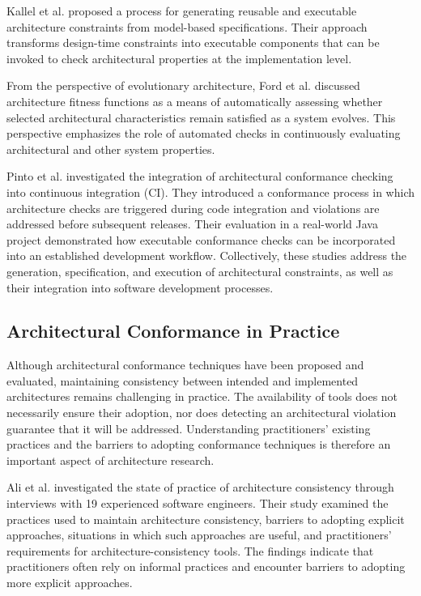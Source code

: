 Kallel et al. \cite{kallel2017generating} proposed a process for
generating reusable and executable architecture constraints from
model-based specifications. Their approach transforms design-time
constraints into executable components that can be invoked to
check architectural properties at the implementation level.

From the perspective of evolutionary architecture, Ford et al.
\cite{ford2017} discussed architecture fitness functions
as a means of automatically assessing whether selected
architectural characteristics remain satisfied as a system
evolves. This perspective emphasizes the role of automated
checks in continuously evaluating architectural and other
system properties.

Pinto et al. \cite{pinto2017} investigated the
integration of architectural conformance checking into continuous
integration (CI). They introduced a conformance process in which
architecture checks are triggered during code integration and
violations are addressed before subsequent releases. Their
evaluation in a real-world Java project demonstrated how
executable conformance checks can be incorporated into an
established development workflow. Collectively, these studies
address the generation, specification, and execution of
architectural constraints, as well as their integration into
software development processes.

\subsection{Architectural Conformance in Practice}

Although architectural conformance techniques have been proposed
and evaluated, maintaining consistency between intended and
implemented architectures remains challenging in practice.
The availability of tools does not necessarily ensure their
adoption, nor does detecting an architectural violation guarantee
that it will be addressed. Understanding practitioners' existing
practices and the barriers to adopting conformance techniques is
therefore an important aspect of architecture research.

Ali et al. \cite{ali2018architecture} investigated the state of
practice of architecture consistency through interviews with
19 experienced software engineers. Their study examined the
practices used to maintain architecture consistency, barriers
to adopting explicit approaches, situations in which such
approaches are useful, and practitioners' requirements for
architecture-consistency tools. The findings indicate that
practitioners often rely on informal practices and encounter
barriers to adopting more explicit approaches.

